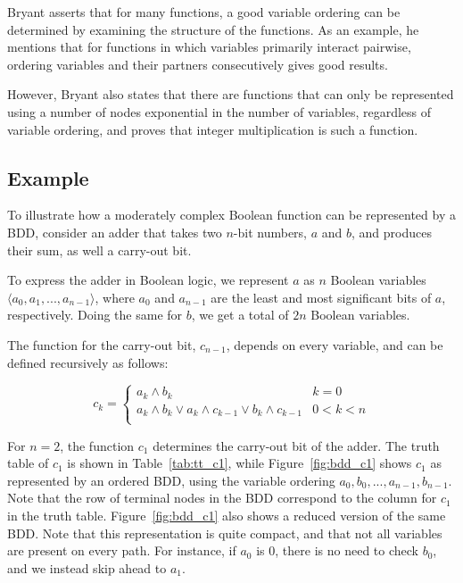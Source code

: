 \documentclass[a4paper,11pt]{kth-mag}
\newcommand{\AND}{\land}
\newcommand{\IOR}{\lor}
\begin{document}
Bryant asserts that for many functions, a good variable ordering can be determined by examining the structure of the functions.
As an example, he mentions that for functions in which variables primarily interact pairwise, ordering variables and their partners consecutively gives good results.

However, Bryant also states that there are functions that can only be represented using a number of nodes exponential in the number of variables, regardless of variable ordering, and proves that integer multiplication is such a function.


\subsection{Example}

To illustrate how a moderately complex Boolean function can be represented by a BDD, consider an adder that takes two $n$-bit numbers, $a$ and $b$, and produces their sum, as well a carry-out bit.

To express the adder in Boolean logic, we represent $a$ as $n$ Boolean variables $\langle a_0, a_1, ..., a_{n-1} \rangle$, where $a_0$ and $a_{n-1}$ are the least and most significant bits of $a$, respectively.
Doing the same for $b$, we get a total of $2n$ Boolean variables.

The function for the carry-out bit, $c_{n-1}$, depends on every variable, and can be defined recursively as follows:

$$
  c_k = \left\{
  \begin{array}{ll}
    a_k \AND b_k                                             & k = 0 \\
    a_k \AND b_k \IOR a_k \AND c_{k-1} \IOR b_k \AND c_{k-1} & 0 < k < n \\
  \end{array}\right.
$$

For $n = 2$, the function $c_1$ determines the carry-out bit of the adder.
The truth table of $c_1$ is shown in Table~\ref{tab:tt_c1}, while Figure~\ref{fig:bdd_c1} shows $c_1$ as represented by an ordered BDD, using the variable ordering $a_0,b_0,...,a_{n-1},b_{n-1}$.
Note that the row of terminal nodes in the BDD correspond to the column for $c_1$ in the truth table.
Figure~\ref{fig:bdd_c1} also shows a reduced version of the same BDD.
Note that this representation is quite compact, and that not all variables are present on every path.
For instance, if $a_0$ is 0, there is no need to check $b_0$, and we instead skip ahead to $a_1$.
\end{document}
